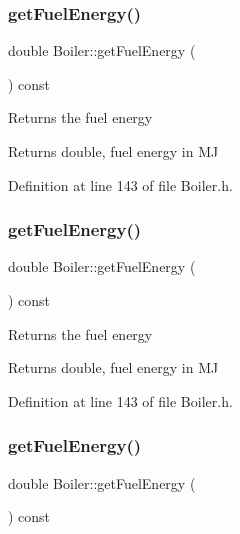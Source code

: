 \subsubsection{\texorpdfstring{get\+Fuel\+Energy()}{getFuelEnergy()}\hspace{0.1cm}{\footnotesize\ttfamily [1/3]}}
{\footnotesize\ttfamily double Boiler\+::get\+Fuel\+Energy (\begin{DoxyParamCaption}{ }\end{DoxyParamCaption}) const\hspace{0.3cm}{\ttfamily [inline]}}

Returns the fuel energy \begin{DoxyReturn}{Returns}
double, fuel energy in MJ 
\end{DoxyReturn}


Definition at line 143 of file Boiler.\+h.

\mbox{\label{class_boiler_a55542a761669c842163b20932f9747d3}} 
\subsubsection{\texorpdfstring{get\+Fuel\+Energy()}{getFuelEnergy()}\hspace{0.1cm}{\footnotesize\ttfamily [2/3]}}
{\footnotesize\ttfamily double Boiler\+::get\+Fuel\+Energy (\begin{DoxyParamCaption}{ }\end{DoxyParamCaption}) const\hspace{0.3cm}{\ttfamily [inline]}}

Returns the fuel energy \begin{DoxyReturn}{Returns}
double, fuel energy in MJ 
\end{DoxyReturn}


Definition at line 143 of file Boiler.\+h.

\mbox{\label{class_boiler_a55542a761669c842163b20932f9747d3}} 
\subsubsection{\texorpdfstring{get\+Fuel\+Energy()}{getFuelEnergy()}\hspace{0.1cm}{\footnotesize\ttfamily [3/3]}}
{\footnotesize\ttfamily double Boiler\+::get\+Fuel\+Energy (\begin{DoxyParamCaption}{ }\end{DoxyParamCaption}) const\hspace{0.3cm}{\ttfamily [inline]}}

